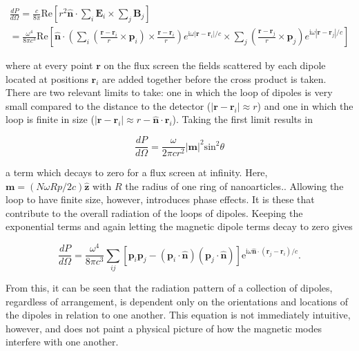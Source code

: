 \documentclass[12pt, letterpaper, twoside]{report}
\begin{document}
\begin{multline}
\frac{dP}{d\Omega} = \frac{c}{8\pi}\textrm{Re}\left[r^2 \hat{\textbf{n}}\cdot \sum_i \textbf{E}_i \times \sum_j \textbf{B}_j\right]\\
= \frac{\omega^4}{8\pi c^3}\textrm{Re}\left[\hat{\textbf{n}}\cdot \left(\sum_i \left(\frac{\textbf{r}-\textbf{r}_i}{r}\times\textbf{p}_i\right)\times\frac{\textbf{r}-\textbf{r}_i}{r}\right)e^{\textrm{i}\omega|\textbf{r}-\textbf{r}_i|/c} \times \sum_j\left(\frac{\textbf{r}-\textbf{r}_j}{r}\times\textbf{p}_j\right)e^{\textrm{i}\omega|\textbf{r}-\textbf{r}_j|/c}\right]
\label{diff_power_full}
\end{multline}

\noindent where at every point $\textbf{r}$ on the flux screen the fields scattered by each dipole located at positions $\textbf{r}_i$ are added together before the cross product is taken. There are two relevant limits to take: one in which the loop of dipoles is very small compared to the distance to the detector ($|\textbf{r}-\textbf{r}_i| \approx r$) and one in which the loop is finite in size ($|\textbf{r}-\textbf{r}_i| \approx r-\hat{\textbf{n}}\cdot\textbf{r}_i$). Taking the first limit results in

\begin{equation}
\frac{dP}{d\Omega} = \frac{\omega}{2\pi c r^2}|\textbf{m}|^2\textrm{sin}^2\theta
\label{mag_dp}
\end{equation}

\noindent a term which decays to zero for a flux screen at infinity. Here, $\textbf{m} = (N\omega Rp/2c)\hat{\textbf{z}}$ with $R$ the radius of one ring of nanoarticles.\cite{Cherqui2014,jackson_classical_1999}. Allowing the loop to have finite size, however, introduces phase effects. It is these that contribute to the overall radiation of the loops of dipoles. Keeping the exponential terms and again letting the magnetic dipole terms decay to zero gives

\begin{equation}
\frac{dP}{d\Omega} = \frac{\omega^4}{8\pi c^3}\sum_{ij}\left[\textbf{p}_i\textbf{p}_j - (\textbf{p}_i\cdot\hat{\textbf{n}})(\textbf{p}_j\cdot\hat{\textbf{n}})\right]\textrm{e}^{\textrm{i}\omega\hat{\textbf{n}}\cdot(\textbf{r}_j-\textbf{r}_i)/c}.
\label{dipoles_only_dp}
\end{equation}

\noindent From this, it can be seen that the radiation pattern of a collection of dipoles, regardless of arrangement, is dependent only on the orientations and locations of the dipoles in relation to one another. This equation is not immediately intuitive, however, and does not paint a physical picture of how the magnetic modes interfere with one another.
\end{document}
